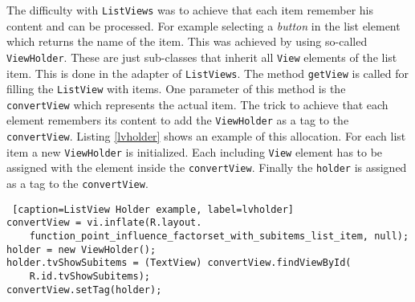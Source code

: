 The difficulty with \texttt{ListViews} was to achieve that each item remember his content and can be processed. For example selecting a \textit{button} in the list element which returns the name of the item. This was achieved by using so-called \texttt{ViewHolder}. These are just sub-classes that inherit all \texttt{View} elements of the list item. This is done in the adapter of \texttt{ListViews}. The method \texttt{getView} is called for filling the \texttt{ListView} with items. One parameter of this method is the \texttt{convertView} which represents the actual item. The trick to achieve that each element remembers its content to add the \texttt{ViewHolder} as a tag to the \texttt{convertView}. Listing \ref{lvholder} shows an example of this allocation. For each list item a new \texttt{ViewHolder} is initialized. Each including \texttt{View} element has to be assigned with the element inside the \texttt{convertView}. Finally the \texttt{holder} is assigned as a tag to the \texttt{convertView}.
\begin{lstlisting} [caption=ListView Holder example, label=lvholder] 
convertView = vi.inflate(R.layout.
	function_point_influence_factorset_with_subitems_list_item, null);
holder = new ViewHolder();
holder.tvShowSubitems = (TextView) convertView.findViewById(
	R.id.tvShowSubitems);
convertView.setTag(holder);
\end{lstlisting}
